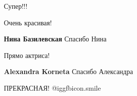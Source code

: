 
 
 
 
 

Супер!!!

Очень красивая!

\textbf{Нина Базилевская} Спасибо Нина

Прямо актриса!

\textbf{Alexandra Korneta} Спасибо Александра

ПРЕКРАСНАЯ!  @igg{fbicon.smile} 
